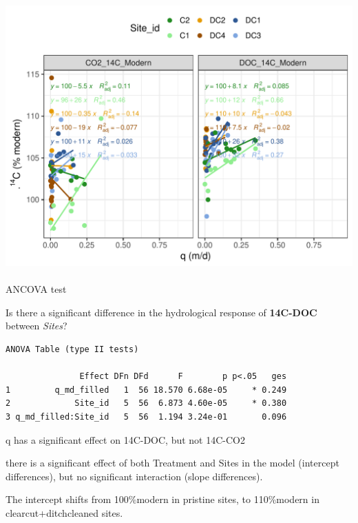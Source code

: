 \documentclass[
  letterpaper,
  DIV=11,
  numbers=noendperiod]{scrartcl}
\makeatletter
\let\oldparagraph\paragraph
\renewcommand{\paragraph}{
    \@ifstar
      \xxxParagraphStar
      \xxxParagraphNoStar
  }
\newcommand{\xxxParagraphStar}[1]{\oldparagraph*{#1}\mbox{}}
\newcommand{\xxxParagraphNoStar}[1]{\oldparagraph{#1}\mbox{}}
\makeatother
\begin{document}
\includegraphics{index_files/figure-pdf/unnamed-chunk-11-1.pdf}

\paragraph{ANCOVA test}\label{ancova-test-1}

Is there a significant difference in the hydrological response of
\textbf{14C-DOC} between \emph{Sites}?

\begin{verbatim}
ANOVA Table (type II tests)

               Effect DFn DFd      F        p p<.05   ges
1         q_md_filled   1  56 18.570 6.68e-05     * 0.249
2             Site_id   5  56  6.873 4.60e-05     * 0.380
3 q_md_filled:Site_id   5  56  1.194 3.24e-01       0.096
\end{verbatim}

\begin{tcolorbox}[enhanced jigsaw, opacitybacktitle=0.6, opacityback=0, arc=.35mm, left=2mm, toprule=.15mm, colback=white, coltitle=black, breakable, rightrule=.15mm, colbacktitle=quarto-callout-note-color!10!white, title=\textcolor{quarto-callout-note-color}{\faInfo}\hspace{0.5em}{Interpretation}, colframe=quarto-callout-note-color-frame, toptitle=1mm, bottomrule=.15mm, bottomtitle=1mm, titlerule=0mm, leftrule=.75mm]

q has a significant effect on 14C-DOC, but not 14C-CO2

there is a significant effect of both Treatment and Sites in the model
(intercept differences), but no significant interaction (slope
differences).

The intercept shifts from 100\%modern in pristine sites, to 110\%modern
in clearcut+ditchcleaned sites.

\end{tcolorbox}
\end{document}
